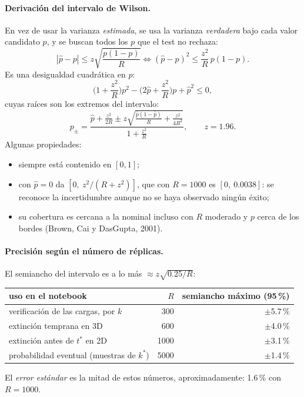 \documentclass[11pt,a4paper]{article}
\theoremstyle{plain}
\theoremstyle{remark}
\begin{document}
\paragraph{Derivación del intervalo de Wilson.} En vez de usar la varianza \emph{estimada}, se usa la varianza \emph{verdadera} bajo cada valor candidato $p$, y se buscan todos los $p$ que el test no rechaza:
\[
|\hat p-p|\le z\sqrt{\frac{p(1-p)}{R}}
\iff
(\hat p-p)^2\le\frac{z^2}{R}\,p(1-p).
\]
Es una desigualdad cuadrática en $p$:
\[
\Big(1+\frac{z^2}{R}\Big)p^2-\Big(2\hat p+\frac{z^2}{R}\Big)p+\hat p^2\le0,
\]
cuyas raíces son los extremos del intervalo:
\[
p_\pm=\frac{\hat p+\frac{z^2}{2R}\pm z\sqrt{\frac{\hat p(1-\hat p)}{R}+\frac{z^2}{4R^2}}}{1+\frac{z^2}{R}},\qquad z=1.96 .
\]
Algunas propiedades:
\begin{itemize}[nosep]
  \item siempre está contenido en $[0,1]$;
  \item con $\hat p=0$ da $[0,\ z^2/(R+z^2)]$, que con $R=1000$ es $[0,\ 0.0038]$: se reconoce la incertidumbre aunque no se haya observado ningún éxito;
  \item su cobertura es cercana a la nominal incluso con $R$ moderado y $p$ cerca de los bordes (Brown, Cai y DasGupta, 2001).
\end{itemize}

\paragraph{Precisión según el número de réplicas.} El semiancho del intervalo es a lo más $\approx z\sqrt{0.25/R}$:

\begin{center}
\small
\begin{tabular}{@{}lrr@{}}
\toprule
uso en el notebook & $R$ & semiancho máximo (95\,\%) \\
\midrule
verificación de las cargas, por $k$ & 300 & $\pm$5.7\,\% \\
extinción temprana en 3D & 600 & $\pm$4.0\,\% \\
extinción antes de $t^\ast$ en 2D & 1000 & $\pm$3.1\,\% \\
probabilidad eventual (muestras de $k^\ast$) & 5000 & $\pm$1.4\,\% \\
\bottomrule
\end{tabular}
\end{center}

\noindent El \emph{error estándar} es la mitad de estos números, aproximadamente: 1.6\,\% con $R=1000$.
\end{document}
